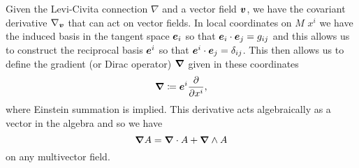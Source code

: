 \documentclass[conf]{new-aiaa}
\begin{document}
Given the Levi-Civita connection $\nabla$ and a vector field $\boldsymbol{v}$, we have the covariant derivative $\nabla_{\boldsymbol{v}}$ that can act on vector fields. In local coordinates on $M$ $x^i$ we have the induced basis in the tangent space $\boldsymbol{e}_i$ so that $\boldsymbol{e}_i\cdot \boldsymbol{e}_j = g_{ij}$ and this allows us to construct the reciprocal basis $\boldsymbol{e}^i$ so that $\boldsymbol{e}^i\cdot \boldsymbol{e}_j = \delta_{ij}$. This then allows us to define the gradient (or Dirac operator) $\boldsymbol{\nabla}$ given in these coordinates
\begin{equation}
    \boldsymbol{\nabla} \coloneqq \boldsymbol{e}^i \frac{\partial}{\partial x^i},
\end{equation}
where Einstein summation is implied. This derivative acts algebraically as a vector in the algebra and so we have
\begin{equation}
\boldsymbol{\nabla} A = \boldsymbol{\nabla} \cdot A + \boldsymbol{\nabla} \wedge A
\end{equation}
on any multivector field. 
\end{document}
